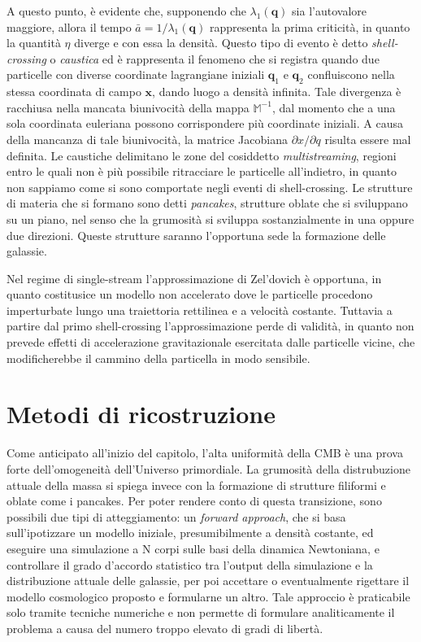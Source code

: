 A questo punto, è evidente che, supponendo che $\lambda_1(\bm{q})$ sia l'autovalore maggiore, allora il tempo 
$\bar{a}=1/\lambda_1(\bm{q})$ rappresenta la prima criticità, in quanto la quantità $\eta$ diverge e con essa la 
densità. Questo tipo di evento è detto \textit{shell-crossing} o \textit{caustica} ed è rappresenta il 
fenomeno che si registra quando due particelle con diverse coordinate lagrangiane iniziali 
$\bm{q}_1$ e $\bm{q}_2$ confluiscono nella stessa coordinata di campo $\bm{x}$, dando luogo a densità
infinita. 
Tale divergenza è racchiusa nella mancata biunivocità della mappa $\mathbb{M}^{-1}$, dal momento che a 
una sola coordinata euleriana possono corrispondere più coordinate iniziali. A causa della mancanza
di tale biunivocità, la matrice Jacobiana $\partial x/\partial q$ risulta essere mal definita.
Le caustiche delimitano le zone del cosiddetto \textit{multistreaming}, regioni entro le quali non è
più possibile ritracciare le particelle all'indietro, in quanto non sappiamo come si sono comportate
negli eventi di shell-crossing. Le strutture di materia che si formano sono detti \textit{pancakes},
strutture oblate che si sviluppano su un piano, nel senso che la grumosità si sviluppa 
sostanzialmente in una oppure due direzioni. Queste strutture saranno l'opportuna sede la formazione
delle galassie.

Nel regime di single-stream l'approssimazione di Zel'dovich è opportuna, in quanto costitusice 
un modello non accelerato dove le particelle procedono imperturbate lungo una traiettoria rettilinea
 e a velocità costante. Tuttavia a partire dal primo shell-crossing l'approssimazione perde di validità, 
in quanto non prevede effetti di accelerazione gravitazionale esercitata dalle particelle vicine, che 
modificherebbe il cammino della particella in modo sensibile. 

\section{Metodi di ricostruzione}

Come anticipato all'inizio del capitolo, l'alta uniformità della CMB è una prova forte dell'omogeneità 
dell'Universo primordiale. La grumosità della distrubuzione attuale della massa si spiega invece con 
la formazione di strutture filiformi e oblate come i pancakes. Per poter rendere conto di questa transizione,
sono possibili due tipi di atteggiamento: un \textit{forward approach}, che si basa sull'ipotizzare un 
modello iniziale, presumibilmente a densità costante, ed eseguire una simulazione a N corpi sulle basi 
della dinamica Newtoniana, e controllare il grado d'accordo statistico tra l'output della simulazione e la 
distribuzione attuale delle galassie, per poi accettare o eventualmente rigettare il modello cosmologico proposto
e formularne un altro.
Tale approccio è praticabile solo tramite tecniche numeriche e non permette di formulare analiticamente
il problema a causa del numero troppo elevato di gradi di libertà.

